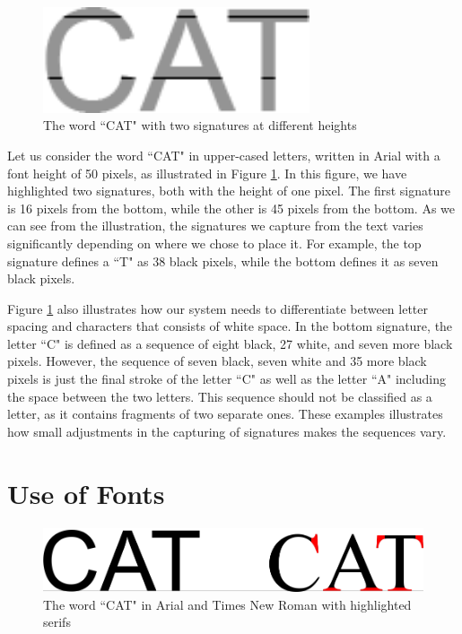 \begin{figure}[ht]
    \centering
    \includegraphics[width=0.7\textwidth]{fig/chapter2/signature_multiple.png}
    \caption{The word ``CAT" with two signatures at different heights}
    \label{fig:thesis-signature-comparison}
\end{figure}

Let us consider the word ``CAT" in upper-cased letters, written in Arial with a font height of 50 pixels, as illustrated in Figure \ref{fig:thesis-signature-comparison}. In this figure, we have highlighted two signatures, both with the height of one pixel. The first signature is 16 pixels from the bottom, while the other is 45 pixels from the bottom. As we can see from the illustration, the signatures we capture from the text varies significantly depending on where we chose to place it. For example, the top signature defines a ``T" as 38 black pixels, while the bottom defines it as seven black pixels.

Figure \ref{fig:thesis-signature-comparison} also illustrates how our system needs to differentiate between letter spacing and characters that consists of white space. In the bottom signature, the letter ``C" is defined as a sequence of eight black, 27 white, and seven more black pixels. However, the sequence of seven black, seven white and 35 more black pixels is just the final stroke of the letter ``C" as well as the letter ``A" including the space between the two letters. This sequence should not be classified as a letter, as it contains fragments of two separate ones. These examples illustrates how small adjustments in the capturing of signatures makes the sequences vary.


\section{Use of Fonts}
\label{sec:use_of_fonts}

\begin{figure}[h]
    \centering
    \includegraphics[width=1.0\textwidth]{fig/chapter2/typeface_comparison.png}
    \caption{The word ``CAT" in Arial and Times New Roman with highlighted serifs}
    \label{fig:typeface-comparison}
\end{figure}

